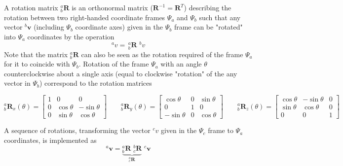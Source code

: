 A rotation matrix $^a_b\mathbf{R}$ is an orthonormal matrix ($\mathbf{R}^{-1}=\mathbf{R}^T$) describing the rotation between two right-handed coordinate frames $\Psi_a$ and $\Psi_b$ such that any vector $^b\mathbf{v}$ (including $\Psi_b$ coordinate axes) given in the $\Psi_b$ frame can be "rotated" into $\Psi_a$ coordinates by the operation
\begin{equation}
^av =\, ^a_b\mathbf{R} \,\,^bv
\end{equation}
Note that the matrix $^a_b\mathbf{R}$ can also be seen as the rotation required of the frame $\Psi_a$ for it to coincide with $\Psi_b$.
Rotation of the frame $\Psi_a$ with an angle $\theta$ counterclockwise about a single axis (equal to clockwise "rotation" of the any vector in $\Psi_b$) correspond to the rotation matrices
\begin{small}
\begin{equation}
^a_b\mathbf{R}_x(\theta) = 
\begin{bmatrix}
1 & 0 & 0\\
0 & \cos\theta & -\sin\theta\\
0 & \sin\theta & \cos\theta
\end{bmatrix} 
\qquad
^a_b\mathbf{R}_y(\theta) = 
\begin{bmatrix}
\cos\theta & 0 & \sin\theta \\
0 & 1 & 0\\
-\sin\theta & 0 & \cos\theta
\end{bmatrix}
\qquad
^a_b\mathbf{R}_z(\theta) = 
\begin{bmatrix}
\cos\theta & -\sin\theta & 0\\
\sin\theta & \cos\theta & 0\\
0 & 0 & 1
\end{bmatrix}
\label{eq:RxRyRz}
\end{equation}
\end{small}
A sequence of rotations, transforming the vector $^cv$ given in the $\Psi_c$ frame to $\Psi_a$ coordinates, is implemented as
\begin{equation}
^a\mathbf{v} = \underbrace{^a_b\mathbf{R} \,\, ^b_c\mathbf{R}}_{^a_c\mathbf{R}} \,\,^c\mathbf{v} 
\end{equation}

